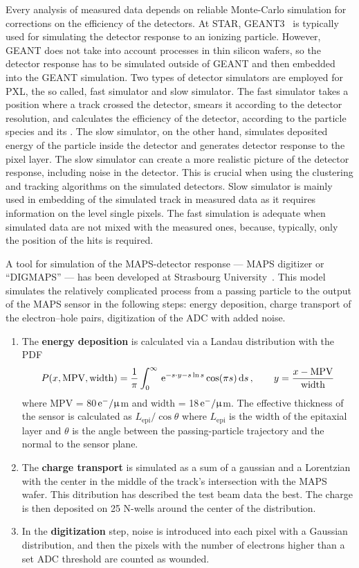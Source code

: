 Every analysis of measured data depends on reliable Monte-Carlo simulation for corrections on the efficiency of the detectors. At STAR, GEANT3~\cite{GEANT} is typically used for simulating the detector response to an ionizing particle. However, GEANT does not take into account processes in thin silicon wafers, so the detector response has to be simulated outside of GEANT and then embedded into the GEANT simulation. Two types of detector simulators are employed for PXL, the so called, fast simulator and slow simulator. The fast simulator takes a position where a track crossed the detector, smears it according to the detector resolution, and calculates the efficiency of the detector, according to the particle species and its \pt\@. The slow simulator, on the other hand, simulates deposited energy of the particle inside the detector and generates detector response to the pixel layer. The slow simulator can create a more realistic picture of the detector response, including noise in the detector. This is crucial when using the clustering and tracking algorithms on the simulated detectors. Slow simulator is mainly used in embedding of the simulated track in measured data as it requires information on the level single pixels. The fast simulation is adequate when simulated data are not mixed with the measured ones, because, typically, only the position of the hits is required.

A tool for simulation of the MAPS-detector response --- MAPS digitizer or ``DIGMAPS'' --- has been developed at Strasbourg University~\cite{DIGMAPS}\@. This model simulates the relatively complicated process from a passing particle to the output of the MAPS sensor in the following steps: energy deposition, charge transport of the electron--hole pairs, digitization of the ADC with added noise.
\begin{enumerate}
 \item The \textbf{energy deposition} is calculated via a Landau distribution with the PDF~\cite{Landau}
 \begin{equation}
  P(x,\mathrm{MPV},\mathrm{width}) = \frac{1}{\pi}\int^{\infty}_{0}\, \mathrm{e}^{-s\cdot y - s\ln s} \cos(\pi s)\,\mathrm{d} s \,,\qquad y=\frac{x-\mathrm{MPV}}{\mathrm{width}}
 \end{equation}
 where MPV = 80$\,\mathrm{e}^-/\upmu$m and width = 18$\,\mathrm{e}^-/\upmu$m.
The effective thickness of the sensor is calculated as $L_\mathrm{epi}/\cos \theta$ where $L_\mathrm{epi}$ is the width of the epitaxial layer and $\theta$ is the angle between the passing-particle trajectory and the normal to the sensor plane.
 \item The \textbf{charge transport} is simulated as a sum of a gaussian and a Lorentzian with the center in the middle of the track's intersection with the MAPS wafer. This ditribution has described the test beam data the best. The charge is then deposited on 25 N-wells around the center of the distribution.
 \item In the \textbf{digitization} step, noise is introduced into each pixel with a Gaussian distribution, and then the pixels with the number of electrons higher than a set ADC threshold are counted as wounded.
\end{enumerate}

